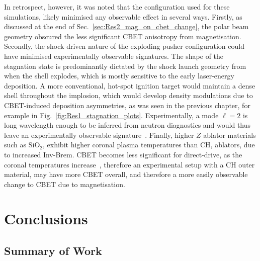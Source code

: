 In retrospect, however, it was noted that the configuration used for these simulations, likely minimised any observable effect in several ways.
Firstly, as discussed at the end of Sec.~\ref{sec:Res2_mag_on_cbet_change}, the polar beam geometry obscured the less significant \ac{CBET} anisotropy from magnetisation.
Secondly, the shock driven nature of the exploding pusher configuration could have minimised experimentally observable signatures.
The shape of the stagnation state is predominantly dictated by the shock launch geometry from when the shell explodes, which is mostly sensitive to the early laser-energy deposition.
A more conventional, hot-spot ignition target would maintain a dense shell throughout the implosion, which would develop density modulations due to \ac{CBET}-induced deposition asymmetries, as was seen in the previous chapter, for example in Fig.~\ref{fig:Res1_stagnation_plots}.
Experimentally, a mode $\ell=2$ is long wavelength enough to be inferred from neutron diagnostics and would thus leave an experimentally observable signature~\cite{woo_inferring_2020,casey_three_2024}.
Finally, higher $Z$ ablator materials such as $\text{SiO}_2$, exhibit higher coronal plasma temperatures than CH, ablators, due to increased \ac{Inv-Brem}.
\ac{CBET} becomes less significant for direct-drive, as the coronal temperatures increase~\cite{colaitis_exploration_2023}, therefore an experimental setup with a CH outer material, may have more \ac{CBET} overall, and therefore a more easily observable change to \ac{CBET} due to magnetisation.

\section{Conclusions}%
\label{sec:Res2_conclusions}



\subsection{Summary of Work}%
\label{sec:Res2_summary}

